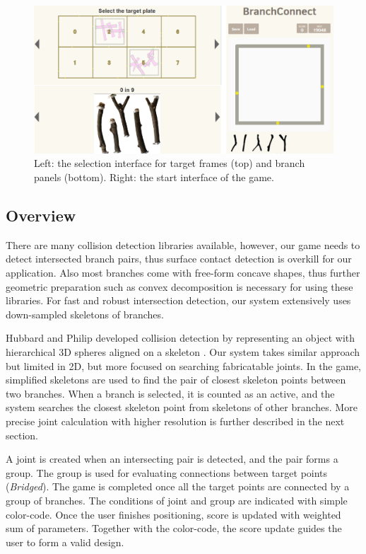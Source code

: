 \begin{figure}[H]
  \begin{center}
    \includegraphics[width = 0.4\paperwidth]{images/interface/game_interface.png}
    \caption{Left: the selection interface for target frames (top) and branch panels (bottom). Right: the start interface of the game.}
    \label{fig:game_interface}
  \end{center}
\end{figure}
%
\subsection{Overview}
There are many collision detection libraries available, however, our game needs to detect intersected branch pairs, thus surface contact detection is overkill for our application.
Also most branches come with free-form concave shapes, thus further geometric preparation such as convex decomposition is necessary for using these libraries.
For fast and robust intersection detection, our system extensively uses down-sampled skeletons of branches.

Hubbard and Philip developed collision detection by representing an object with hierarchical 3D spheres aligned on a skeleton \cite{Hubbard:1996:APS:231731.231732}.
Our system takes similar approach but limited in 2D, but more focused on searching fabricatable joints.
In the game, simplified skeletons are used to find the pair of closest skeleton points between two branches.
When a branch is selected, it is counted as an active, and the system searches the closest skeleton point from skeletons of other branches.
More precise joint calculation with higher resolution is further described in the next section.

A joint is created when an intersecting pair is detected, and the pair forms a group.
The group is used for evaluating connections between target points (\textit{Bridged}).
The game is completed once all the target points are connected by a group of branches.
The conditions of joint and group are indicated with simple color-code.
Once the user finishes positioning, score is updated with weighted sum of parameters.
Together with the color-code, the score update guides the user to form a valid design.


